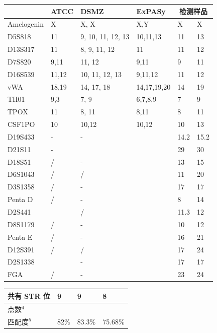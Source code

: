 \documentclass[UTF8,10pt,a4paper,fontset=fandol]{ctexart}
\begin{document}
\noindent
\begin{tabular}{|p{2.1cm}|p{2.0cm}|p{2.8cm}|p{2.8cm}|p{1.2cm}|p{1.2cm}|}
\hline
 & ATCC & DSMZ & ExPASy & \multicolumn{2}{c|}{检测样品} \\
\hline
Amelogenin & X & X, X & X,Y & X & X \\
\hline
D5S818 & 11 & 9, 10, 11, 12, 13 & 10,11,13 & 11 & 13 \\
\hline
D13S317 & 11 & 8, 9, 11, 12 & 11 & 11 & 12 \\
\hline
D7S820 & 9,11 & 11, 12 & 9,11 & 9 & 11 \\
\hline
D16S539 & 11,12 & 10, 11, 12, 13 & 9,11,12 & 11 & 12 \\
\hline
vWA & 18,19 & 14, 17, 18 & 14,17,19,20 & 14 & 19 \\
\hline
TH01 & 9,3 & 7, 9 & 6,7,8,9 & 7 & 9 \\
\hline
TPOX & 11 & 8, 11 & 8,11 & 8 & 11 \\
\hline
CSF1PO & 10 & 10,12 & 10,12 & 10 & 13 \\
\hline
D19S433 & - & - &  & 14.2 & 15.2 \\
\hline
D21S11 & - &  &  & 29 & 30 \\
\hline
D18S51 & / & - &  & 13 & 15 \\
\hline
D6S1043 & / & / &  & 11 & 20 \\
\hline
D3S1358 & / & - &  & 17 & 17 \\
\hline
Penta D & / & - &  & 8 & 14 \\
\hline
D2S441 &  & / &  & 11.3 & 12 \\
\hline
D8S1179 & / & - &  & 10 & 12 \\
\hline
Penta E & / & - &  & 16 & 21 \\
\hline
D12S391 & / & / &  & 17 & 24 \\
\hline
D2S1338 &  & - &  & 17 & 17 \\
\hline
FGA & / & - &  & 23 & 24 \\
\hline
\end{tabular}

\vspace{0.3em}

\noindent
\begin{tabular}{|p{3.5cm}|p{2.2cm}|p{2.2cm}|p{2.2cm}|}
\hline
共有 STR 位 & 9 & 9 & 8 \\
\hline
点数$^{4}$ &  &  &  \\
\hline
匹配度$^{5}$ & 82\% & 83.3\% & 75.68\% \\
\hline
\end{tabular}
\end{document}
